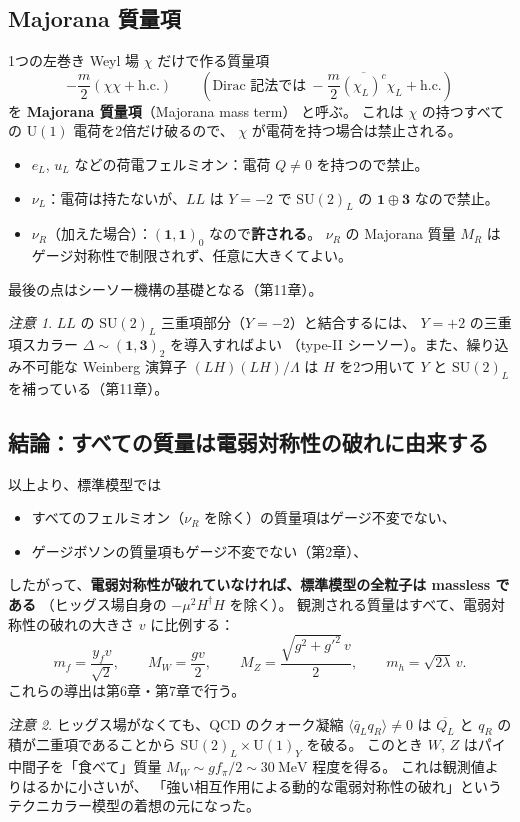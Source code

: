 \documentclass[uplatex,dvipdfmx,a4paper,11pt,openany]{jsbook}
\newcommand{\term}[2]{\textbf{#1}（#2）}
\numberwithin{equation}{chapter}
\theoremstyle{definition}
\theoremstyle{plain}
\theoremstyle{remark}
\newtheorem{remark}{注意}[chapter]
\newcommand{\SU}{\mathrm{SU}}
\newcommand{\U}{\mathrm{U}}
\newcommand{\hc}{\mathrm{h.c.}}
\begin{document}
\subsection{Majorana 質量項}
1つの左巻き Weyl 場 $\chi$ だけで作る質量項
\begin{equation}
-\frac{m}{2}\left(\chi\chi+\hc\right)
\qquad\left(\text{Dirac 記法では}\ -\frac m2\overline{(\chi_L)^c}\chi_L+\hc\right)
\end{equation}
を \term{Majorana 質量項}{Majorana mass term} と呼ぶ。
これは $\chi$ の持つすべての $\U(1)$ 電荷を2倍だけ破るので、
$\chi$ が電荷を持つ場合は禁止される。
\begin{itemize}
    \item $e_L$, $u_L$ などの荷電フェルミオン：電荷 $Q\ne0$ を持つので禁止。
    \item $\nu_L$：電荷は持たないが、$LL$ は $Y=-2$ で $\SU(2)_L$ の $\mathbf1\oplus\mathbf3$ なので禁止。
    \item $\nu_R$（加えた場合）：$(\mathbf1,\mathbf1)_0$ なので\textbf{許される}。
    $\nu_R$ の Majorana 質量 $M_R$ はゲージ対称性で制限されず、任意に大きくてよい。
\end{itemize}
最後の点はシーソー機構の基礎となる（第11章）。
\begin{remark}
$LL$ の $\SU(2)_L$ 三重項部分（$Y=-2$）と結合するには、
$Y=+2$ の三重項スカラー $\Delta\sim(\mathbf1,\mathbf3)_2$ を導入すればよい
（type-II シーソー）。また、繰り込み不可能な Weinberg 演算子
$(LH)(LH)/\Lambda$ は $H$ を2つ用いて $Y$ と $\SU(2)_L$ を補っている（第11章）。
\end{remark}
\subsection{結論：すべての質量は電弱対称性の破れに由来する}
以上より、標準模型では
\begin{itemize}
    \item すべてのフェルミオン（$\nu_R$ を除く）の質量項はゲージ不変でない、
    \item ゲージボソンの質量項もゲージ不変でない（第2章）、
\end{itemize}
したがって、\textbf{電弱対称性が破れていなければ、標準模型の全粒子は massless である}
（ヒッグス場自身の $-\mu^2H^\dagger H$ を除く）。
観測される質量はすべて、電弱対称性の破れの大きさ $v$ に比例する：
\begin{equation}
m_f=\frac{y_fv}{\sqrt2},\qquad
M_W=\frac{gv}{2},\qquad
M_Z=\frac{\sqrt{g^2+g'^2}\,v}{2},\qquad
m_h=\sqrt{2\lambda}\,v .
\end{equation}
これらの導出は第6章・第7章で行う。
\begin{remark}
ヒッグス場がなくても、QCD のクォーク凝縮 $\langle\bar q_Lq_R\rangle\ne0$ は
$\overline{Q_L}$ と $q_R$ の積が二重項であることから $\SU(2)_L\times\U(1)_Y$ を破る。
このとき $W$, $Z$ はパイ中間子を「食べて」質量
$M_W\sim gf_\pi/2\sim30\ \mathrm{MeV}$ 程度を得る。
これは観測値よりはるかに小さいが、
「強い相互作用による動的な電弱対称性の破れ」というテクニカラー模型の着想の元になった。
\end{remark}
\end{document}
